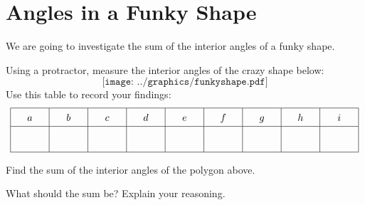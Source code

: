 \newpage
\section{Angles in a Funky Shape} 

We are going to investigate the sum of the interior angles of a
funky shape.

\begin{prob}
Using a protractor, measure the interior angles of the crazy shape below:
\vspace{0.1in}
\[
\texttt{[image: ../graphics/funkyshape.pdf]}
\]
Use this table to record your findings:
\[
\vspace{0.1in}
{\renewcommand{\arraystretch}{1.5}
\begin{array}{|c|c|c|c|c|c|c|c|c|}\hline
a & b & c & d & e & f & g & h & i \\\hline
\rule[7mm]{10mm}{0mm}  & \rule[7mm]{10mm}{0mm}    & \rule[7mm]{10mm}{0mm}   & \rule[7mm]{10mm}{0mm}   &  \rule[7mm]{10mm}{0mm}   & \rule[7mm]{10mm}{0mm}    & \rule[7mm]{10mm}{0mm}   & \rule[7mm]{10mm}{0mm}   & \rule[7mm]{10mm}{0mm}   \\ \hline
\end{array}}
\]
\end{prob}

\begin{prob}
Find the sum of the interior angles of the polygon above. 
\end{prob}


\begin{prob}
What should the sum be? Explain your reasoning. 
\end{prob}


